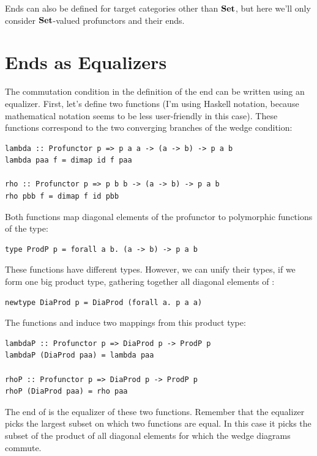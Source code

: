 Ends can also be defined for target categories other than $\mathbf{Set}$,
but here we'll only consider $\mathbf{Set}$-valued profunctors and their
ends.

\section{Ends as Equalizers}\label{ends-as-equalizers}

The commutation condition in the definition of the end can be written
using an equalizer. First, let's define two functions (I'm using Haskell
notation, because mathematical notation seems to be less user-friendly
in this case). These functions correspond to the two converging branches
of the wedge condition:

\begin{Verbatim}[commandchars=\\\{\}]
lambda :: Profunctor p => p a a -> (a -> b) -> p a b
lambda paa f = dimap id f paa

rho :: Profunctor p => p b b -> (a -> b) -> p a b
rho pbb f = dimap f id pbb
\end{Verbatim}
Both functions map diagonal elements of the profunctor  to
polymorphic functions of the type:

\begin{Verbatim}[commandchars=\\\{\}]
type ProdP p = forall a b. (a -> b) -> p a b
\end{Verbatim}
These functions have different types. However, we can unify their types,
if we form one big product type, gathering together all diagonal
elements of :

\begin{Verbatim}[commandchars=\\\{\}]
newtype DiaProd p = DiaProd (forall a. p a a)
\end{Verbatim}
The functions  and  induce two mappings from
this product type:

\begin{Verbatim}[commandchars=\\\{\}]
lambdaP :: Profunctor p => DiaProd p -> ProdP p
lambdaP (DiaProd paa) = lambda paa

rhoP :: Profunctor p => DiaProd p -> ProdP p
rhoP (DiaProd paa) = rho paa
\end{Verbatim}
The end of  is the equalizer of these two functions. Remember
that the equalizer picks the largest subset on which two functions are
equal. In this case it picks the subset of the product of all diagonal
elements for which the wedge diagrams commute.

